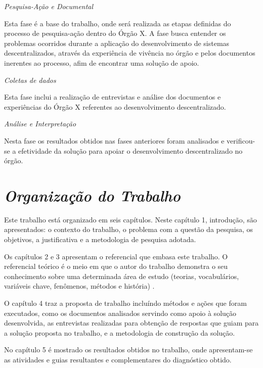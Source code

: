 \textit{Pesquisa-Ação e Documental}

Esta fase é a base do trabalho, onde será realizada as etapas definidas do processo de pesquisa-ação dentro do Órgão X. A fase busca entender os problemas ocorridos durante a aplicação do desenvolvimento de sistemas descentralizados, através da experiência de vivência no órgão e pelos documentos inerentes ao processo, afim de encontrar uma solução de apoio.

\textit{Coletas de dados}

Esta fase inclui a realização de entrevistas e análise dos documentos e experiências do Órgão X referentes ao desenvolvimento descentralizado.

\textit{Análise e Interpretação}

Nesta fase os resultados obtidos nas fases anteriores foram analisados e verificou-se a efetividade da solução para apoiar o desenvolvimento descentralizado no órgão.

\section{\textit{Organização do Trabalho}}

Este trabalho está organizado em seis capítulos. Neste capítulo 1, introdução, são
apresentados: o contexto do trabalho, o problema com a questão da pesquisa, os
objetivos, a justificativa e a metodologia de pesquisa adotada.

Os capítulos 2 e 3 apresentam o referencial que embasa este trabalho. O referencial teórico é o meio em que o autor do trabalho demonstra o seu conhecimento sobre uma determinada área de estudo (teorias, vocabulários, variáveis chave, fenômenos, métodos e história) \cite{randolph2009}.

O capítulo 4 traz a proposta de trabalho incluíndo métodos e ações que foram executados, como os documentos analisados servindo como apoio à solução desenvolvida, as entrevistas realizadas para obtenção de respostas que guiam para a solução proposta no trabalho, e a metodologia de construção da solução.

No capítulo 5 é mostrado os resultados obtidos no trabalho, onde apresentam-se as atividades e guias resultantes e complementares do diagnóstico obtido.

